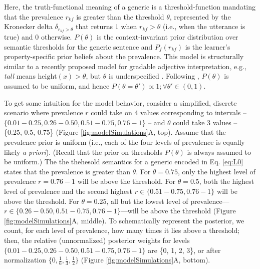 \documentclass[floatsintext,doc]{apa6}
\begin{document}
Here, the truth-functional meaning of a generic is a threshold-function mandating that the prevalence $r_{kf}$ is greater than the threshold \(\theta\), represented by the Kronecker delta $\delta_{r_{kf} > \theta}$ that returns \(1\) when \(r_{kf} > \theta\) (i.e., when the utterance is true) and \(0\) otherwise.
$P(\theta)$ is the context-invariant prior distribution over semantic thresholds for the generic sentence and $P_{f}(r_{kf})$ is the learner's property-specific prior beliefs about the prevalence.
This model is structurally similar to a recently proposed model for gradable adjective interpretation, e.g., \emph{tall} means $\text{height}(x) > \theta$, but $\theta$ is underspecified \cite{Lassiter2015}.
Following , $P(\theta)$ is assumed to be uniform, and hence $P(\theta = \theta') \propto 1; \forall \theta' \in (0, 1)$. 

To get some intuition for the model behavior, consider a simplified, discrete scenario where prevalence $r$ could take on 4 values corresponding to intervals -- $\{0.01-0.25, 0.26 - 0.50, 0.51 - 0.75, 0.76 - 1\}$ -- and $\theta$ could take 3 values -- \{0.25, 0.5, 0.75\} (Figure \ref{fig:modelSimulations}A, top). Assume that the prevalence prior is uniform (i.e., each of the four levels of prevalence is equally likely \emph{a priori}). (Recall that the prior on thresholds $P(\theta)$ is always assumed to be uniform.)
The the thehesold semantics for a generic encoded in Eq. \ref{eq:L0} states that the prevalence is greater than $\theta$.
For $\theta = 0.75$, only the highest level of prevalence $r = 0.76 - 1$ will be above the threshold.  
For $\theta = 0.5$, both the highest level of prevalence and the second highest $r \in \{0.51 - 0.75, 0.76 - 1\}$ will be above the threshold.  
For $\theta = 0.25$, all but the lowest level of prevalence---$r \in \{0.26 - 0.50, 0.51 - 0.75, 0.76 - 1\}$---will be above the threshold (Figure \ref{fig:modelSimulations}A, middle).  
To schematically represent the posterior, we count, for each level of prevalence, how many times it lies above a threshold; then, the relative (unnormalized) posterior weights for levels $\{0.01-0.25, 0.26 - 0.50, 0.51 - 0.75, 0.76 - 1 \}$ are \{0, 1, 2, 3\}, or after normalization  $\{0, \frac{1}{6}, \frac{1}{3}, \frac{1}{2}\}$ (Figure \ref{fig:modelSimulations}A, bottom).


\end{document}
